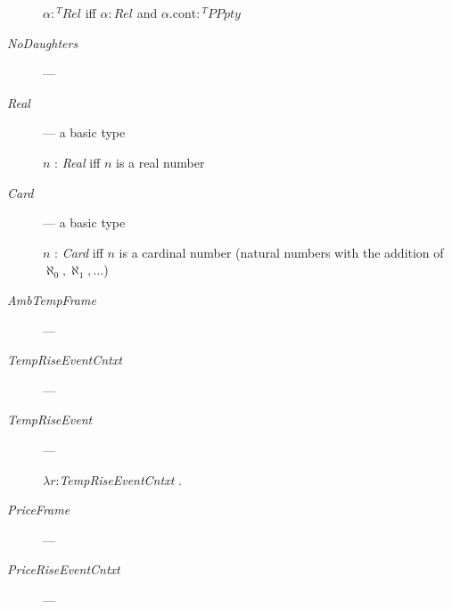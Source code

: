 \begin{description}
  $\alpha:{^T\textit{Rel}}$ iff
  $\alpha:\textit{Rel}$ and $\alpha.\text{cont}:{^T\textit{PPpty}}$
  
\item[\textnormal{\textit{NoDaughters}}] ---

  
\item[\textnormal{\textit{Real}}] --- a basic type

  $n$ : \textit{Real} iff $n$ is a real number

  
\item[\textnormal{\textit{Card}}] --- a basic type

  $n$ : \textit{Card} iff $n$ is a cardinal number (natural numbers
  with the addition of $\aleph_0, \aleph_1,\ldots$)
 

  

\item[\textnormal{\textit{AmbTempFrame}}] --- 

      
    \item[\textnormal{\textit{TempRiseEventCntxt}}] ---
      
    \item[\textnormal{\textit{TempRiseEvent}}] ---
      
      $\lambda r$:\textit{TempRiseEventCntxt} .\\  
\hspace*{2em}
      
    \item[\textnormal{\textit{PriceFrame}}] --- 
      
    \item[\textnormal{\textit{PriceRiseEventCntxt}}] --- 
 

\end{description}

